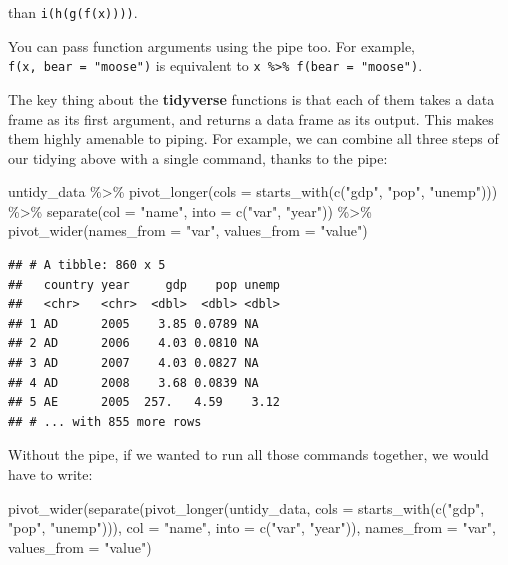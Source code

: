 \documentclass[
  12pt,
  oneside,openany]{book}
\newenvironment{Shaded}{\begin{snugshade}}{\end{snugshade}}
\newcommand{\AttributeTok}[1]{\textcolor[rgb]{0.77,0.63,0.00}{#1}}
\newcommand{\FunctionTok}[1]{\textcolor[rgb]{0.00,0.00,0.00}{#1}}
\newcommand{\NormalTok}[1]{#1}
\newcommand{\SpecialCharTok}[1]{\textcolor[rgb]{0.00,0.00,0.00}{#1}}
\newcommand{\StringTok}[1]{\textcolor[rgb]{0.31,0.60,0.02}{#1}}
\begin{document}
than \texttt{i(h(g(f(x))))}.

You can pass function arguments using the pipe too. For example, \texttt{f(x,\ bear\ =\ "moose")} is equivalent to \texttt{x\ \%\textgreater{}\%\ f(bear\ =\ "moose")}.

The key thing about the \textbf{tidyverse} functions is that each of them takes a data frame as its first argument, and returns a data frame as its output. This makes them highly amenable to piping. For example, we can combine all three steps of our tidying above with a single command, thanks to the pipe:

\begin{Shaded}
\begin{Highlighting}[]
\NormalTok{untidy\_data }\SpecialCharTok{\%\textgreater{}\%}
  \FunctionTok{pivot\_longer}\NormalTok{(}\AttributeTok{cols =} \FunctionTok{starts\_with}\NormalTok{(}\FunctionTok{c}\NormalTok{(}\StringTok{"gdp"}\NormalTok{, }\StringTok{"pop"}\NormalTok{, }\StringTok{"unemp"}\NormalTok{))) }\SpecialCharTok{\%\textgreater{}\%}
  \FunctionTok{separate}\NormalTok{(}\AttributeTok{col =} \StringTok{"name"}\NormalTok{,}
           \AttributeTok{into =} \FunctionTok{c}\NormalTok{(}\StringTok{"var"}\NormalTok{, }\StringTok{"year"}\NormalTok{)) }\SpecialCharTok{\%\textgreater{}\%}
  \FunctionTok{pivot\_wider}\NormalTok{(}\AttributeTok{names\_from =} \StringTok{"var"}\NormalTok{,}
              \AttributeTok{values\_from =} \StringTok{"value"}\NormalTok{)}
\end{Highlighting}
\end{Shaded}

\begin{verbatim}
## # A tibble: 860 x 5
##   country year     gdp    pop unemp
##   <chr>   <chr>  <dbl>  <dbl> <dbl>
## 1 AD      2005    3.85 0.0789 NA   
## 2 AD      2006    4.03 0.0810 NA   
## 3 AD      2007    4.03 0.0827 NA   
## 4 AD      2008    3.68 0.0839 NA   
## 5 AE      2005  257.   4.59    3.12
## # ... with 855 more rows
\end{verbatim}

Without the pipe, if we wanted to run all those commands together, we would have to write:

\begin{Shaded}
\begin{Highlighting}[]
\FunctionTok{pivot\_wider}\NormalTok{(}\FunctionTok{separate}\NormalTok{(}\FunctionTok{pivot\_longer}\NormalTok{(untidy\_data,}
                                  \AttributeTok{cols =} \FunctionTok{starts\_with}\NormalTok{(}\FunctionTok{c}\NormalTok{(}\StringTok{"gdp"}\NormalTok{, }\StringTok{"pop"}\NormalTok{, }\StringTok{"unemp"}\NormalTok{))),}
                     \AttributeTok{col =} \StringTok{"name"}\NormalTok{,}
                     \AttributeTok{into =} \FunctionTok{c}\NormalTok{(}\StringTok{"var"}\NormalTok{, }\StringTok{"year"}\NormalTok{)),}
            \AttributeTok{names\_from =} \StringTok{"var"}\NormalTok{,}
            \AttributeTok{values\_from =} \StringTok{"value"}\NormalTok{)}
\end{Highlighting}
\end{Shaded}
\end{document}
